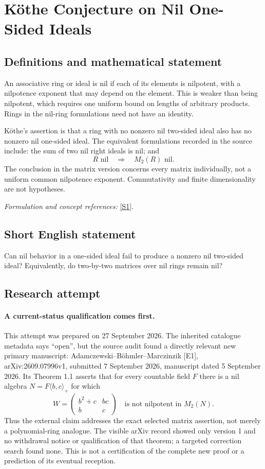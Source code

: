 \documentclass[11pt]{article}
\begin{document}
\section*{\texorpdfstring{Köthe Conjecture on Nil One-Sided Ideals}{Köthe Conjecture on Nil One-Sided Ideals}}\label{467}
\subsection{Definitions and mathematical statement}
An associative ring or ideal is nil if each of its elements is nilpotent, with a nilpotence exponent that may depend on the element. This is weaker than being nilpotent, which requires one uniform bound on lengths of arbitrary products. Rings in the nil-ring formulations need not have an identity.

K\"othe's assertion is that a ring with no nonzero nil two-sided ideal also has no nonzero nil one-sided ideal. The equivalent formulations recorded in the source include: the sum of two nil right ideals is nil; and
\[
 R\text{ nil}\quad\Longrightarrow\quad M_2(R)\text{ nil}.
\]
The conclusion in the matrix version concerns every matrix individually, not a uniform common nilpotence exponent. Commutativity and finite dimensionality are not hypotheses.
\par\smallskip\textit{Formulation and concept references:} \href{https://www.mathunion.org/fileadmin/ICM/Proceedings/ICM2006.2/ICM2006.2.ocr.pdf}{[S1]}.

\subsection{Short English statement}
Can nil behavior in a one-sided ideal fail to produce a nonzero nil two-sided ideal? Equivalently, do two-by-two matrices over nil rings remain nil?
\subsection{Research attempt}
\paragraph{A current-status qualification comes first.}
This attempt was prepared on 27 September 2026. The inherited catalogue
metadata says ``open'', but the source audit found a directly relevant
new primary manuscript: Adamczewski--B\"ohmler--Marczinzik [E1],
arXiv:2609.07996v1, submitted 7 September 2026, manuscript dated
5 September 2026. Its Theorem 1.1 asserts that for every countable field
$F$ there is a nil algebra $N=F\langle b,c\rangle_+$ for which
\[
 W=\begin{pmatrix}b^2+c&bc\\ b&c\end{pmatrix}
 \quad\text{is not nilpotent in }M_2(N).
\]
Thus the external claim addresses the exact selected matrix assertion,
not merely a polynomial-ring analogue. The visible arXiv record showed
only version 1 and no withdrawal notice or qualification of that theorem;
a targeted correction search found none. This is not a certification of
the complete new proof or a prediction of its eventual reception.
\end{document}
